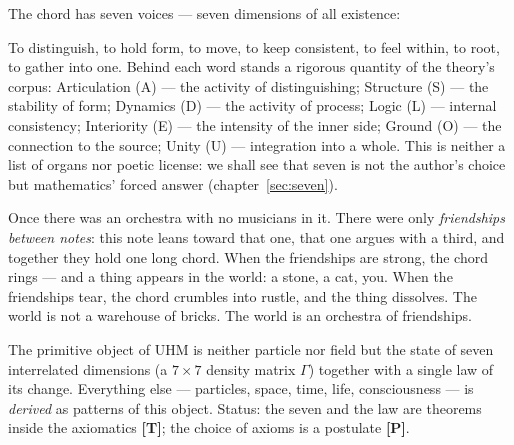 \documentclass[11pt,letterpaper]{article}
\newcommand{\Gam}{\Gamma}
\newcommand{\stT}{\textbf{[T]}\xspace}
\newcommand{\stP}{\textbf{[P]}\xspace}
\begin{document}
The chord has seven voices --- seven dimensions of all existence:

\begin{center}
\end{center}

To distinguish, to hold form, to move, to keep consistent, to feel
within, to root, to gather into one. Behind each word stands a
rigorous quantity of the theory's corpus: Articulation (A) --- the
activity of distinguishing; Structure (S) --- the stability of form;
Dynamics (D) --- the activity of process; Logic (L) --- internal
consistency; Interiority (E) --- the intensity of the inner side;
Ground (O) --- the connection to the source; Unity (U) ---
integration into a whole. This is neither a list of organs nor poetic
license:
we shall see that seven is not the author's choice but mathematics'
forced answer (chapter~\ref{sec:seven}).

\begin{talebox}
Once there was an orchestra with no musicians in it. There were only
\emph{friendships between notes}: this note leans toward that one,
that one argues with a third, and together they hold one long chord.
When the friendships are strong, the chord rings --- and a thing
appears in the world: a stone, a cat, you. When the friendships tear,
the chord crumbles into rustle, and the thing dissolves. The world is
not a warehouse of bricks. The world is an orchestra of friendships.
\end{talebox}

\begin{factbox}[To be precise]
The primitive object of UHM is neither particle nor field but the
state of seven interrelated dimensions (a $7{\times}7$ density
matrix $\Gam$) together with a single law of its change. Everything
else --- particles, space, time, life, consciousness --- is
\emph{derived} as patterns of this object. Status: the seven and the
law are theorems inside the axiomatics \stT; the choice of axioms is a
postulate \stP.
\end{factbox}
\end{document}
